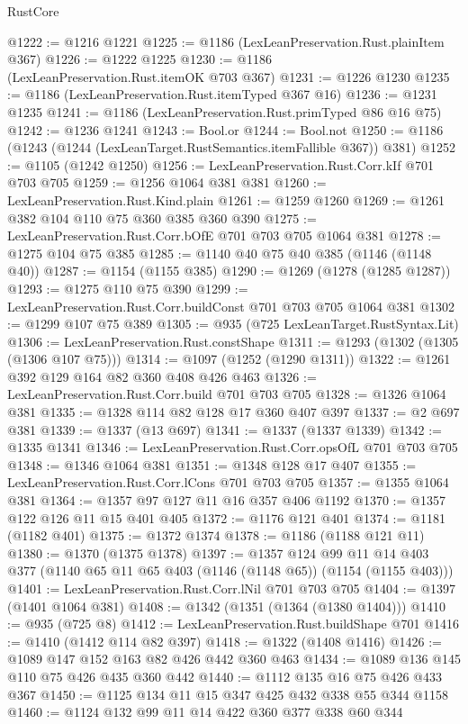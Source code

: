 \begin{lexlean}{RustCore}
\begin{coremodule}
@1222 := @1216 @1221
@1225 := @1186 (LexLeanPreservation.Rust.plainItem @367)
@1226 := @1222 @1225
@1230 := @1186 (LexLeanPreservation.Rust.itemOK @703 @367)
@1231 := @1226 @1230
@1235 := @1186 (LexLeanPreservation.Rust.itemTyped @367 @16)
@1236 := @1231 @1235
@1241 := @1186 (LexLeanPreservation.Rust.primTyped @86 @16 @75)
@1242 := @1236 @1241
@1243 := Bool.or
@1244 := Bool.not
@1250 := @1186 (@1243 (@1244 (LexLeanTarget.RustSemantics.itemFallible @367)) @381)
@1252 := @1105 (@1242 @1250)
@1256 := LexLeanPreservation.Rust.Corr.kIf @701 @703 @705
@1259 := @1256 @1064 @381 @381
@1260 := LexLeanPreservation.Rust.Kind.plain
@1261 := @1259 @1260
@1269 := @1261 @382 @104 @110 @75 @360 @385 @360 @390
@1275 := LexLeanPreservation.Rust.Corr.bOfE @701 @703 @705 @1064 @381
@1278 := @1275 @104 @75 @385
@1285 := @1140 @40 @75 @40 @385 (@1146 (@1148 @40))
@1287 := @1154 (@1155 @385)
@1290 := @1269 (@1278 (@1285 @1287))
@1293 := @1275 @110 @75 @390
@1299 := LexLeanPreservation.Rust.Corr.buildConst @701 @703 @705 @1064 @381
@1302 := @1299 @107 @75 @389
@1305 := @935 (@725 LexLeanTarget.RustSyntax.Lit)
@1306 := LexLeanPreservation.Rust.constShape
@1311 := @1293 (@1302 (@1305 (@1306 @107 @75)))
@1314 := @1097 (@1252 (@1290 @1311))
@1322 := @1261 @392 @129 @164 @82 @360 @408 @426 @463
@1326 := LexLeanPreservation.Rust.Corr.build @701 @703 @705
@1328 := @1326 @1064 @381
@1335 := @1328 @114 @82 @128 @17 @360 @407 @397
@1337 := @2 @697 @381
@1339 := @1337 (@13 @697)
@1341 := @1337 (@1337 @1339)
@1342 := @1335 @1341
@1346 := LexLeanPreservation.Rust.Corr.opsOfL @701 @703 @705
@1348 := @1346 @1064 @381
@1351 := @1348 @128 @17 @407
@1355 := LexLeanPreservation.Rust.Corr.lCons @701 @703 @705
@1357 := @1355 @1064 @381
@1364 := @1357 @97 @127 @11 @16 @357 @406 @1192
@1370 := @1357 @122 @126 @11 @15 @401 @405
@1372 := @1176 @121 @401
@1374 := @1181 (@1182 @401)
@1375 := @1372 @1374
@1378 := @1186 (@1188 @121 @11)
@1380 := @1370 (@1375 @1378)
@1397 := @1357
    @124
    @99
    @11
    @14
    @403
    @377
    (@1140 @65 @11 @65 @403 (@1146 (@1148 @65)) (@1154 (@1155 @403)))
@1401 := LexLeanPreservation.Rust.Corr.lNil @701 @703 @705
@1404 := @1397 (@1401 @1064 @381)
@1408 := @1342 (@1351 (@1364 (@1380 @1404)))
@1410 := @935 (@725 @8)
@1412 := LexLeanPreservation.Rust.buildShape @701
@1416 := @1410 (@1412 @114 @82 @397)
@1418 := @1322 (@1408 @1416)
@1426 := @1089 @147 @152 @163 @82 @426 @442 @360 @463
@1434 := @1089 @136 @145 @110 @75 @426 @435 @360 @442
@1440 := @1112 @135 @16 @75 @426 @433 @367
@1450 := @1125 @134 @11 @15 @347 @425 @432 @338 @55 @344 @1158
@1460 := @1124 @132 @99 @11 @14 @422 @360 @377 @338 @60 @344

\end{coremodule}
\end{lexlean}

